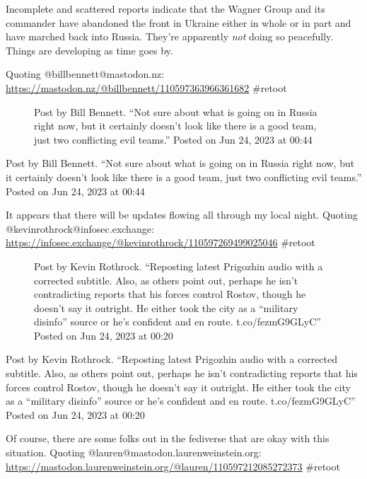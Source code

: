 Incomplete and scattered reports indicate that the Wagner Group and its
commander have abandoned the front in Ukraine either in whole or in part
and have marched back into Russia. They're apparently \emph{not} doing
so peacefully. Things are developing as time goes by.

Quoting @billbennett@mastodon.nz:
\url{https://mastodon.nz/@billbennett/110597363966361682} \#retoot

\begin{figure}
\centering
{}
\caption{Post by Bill Bennett. ``Not sure about what is going on in
Russia right now, but it certainly doesn't look like there is a good
team, just two conflicting evil teams.'' Posted on Jun 24, 2023 at
00:44}
\end{figure}

Post by Bill Bennett. ``Not sure about what is going on in Russia right
now, but it certainly doesn't look like there is a good team, just two
conflicting evil teams.'' Posted on Jun 24, 2023 at 00:44

It appears that there will be updates flowing all through my local
night. Quoting @kevinrothrock@infosec.exchange:
\url{https://infosec.exchange/@kevinrothrock/110597269499025046}
\#retoot

\begin{figure}
\centering
{}
\caption{Post by Kevin Rothrock. ``Reposting latest Prigozhin audio with
a corrected subtitle. Also, as others point out, perhaps he isn't
contradicting reports that his forces control Rostov, though he doesn't
say it outright. He either took the city as a ``military disinfo''
source or he's confident and en route. t.co/fezmG9GLyC'' Posted on Jun
24, 2023 at 00:20}
\end{figure}

Post by Kevin Rothrock. ``Reposting latest Prigozhin audio with a
corrected subtitle. Also, as others point out, perhaps he isn't
contradicting reports that his forces control Rostov, though he doesn't
say it outright. He either took the city as a ``military disinfo''
source or he's confident and en route. t.co/fezmG9GLyC'' Posted on Jun
24, 2023 at 00:20

Of course, there are some folks out in the fediverse that are okay with
this situation. Quoting @lauren@mastodon.laurenweinstein.org:
\url{https://mastodon.laurenweinstein.org/@lauren/110597212085272373}
\#retoot

